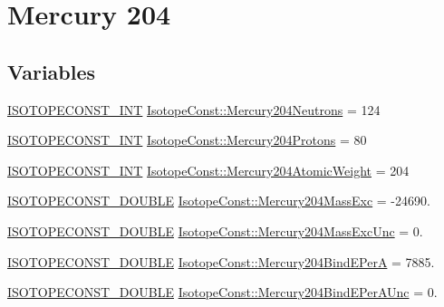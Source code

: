 \hypertarget{group___isotope_const-_mercury-_hg204}{}\section{Mercury 204}
\label{group___isotope_const-_mercury-_hg204}
\subsection*{Variables}
\begin{DoxyCompactItemize}
\item 
\mbox{\hyperlink{group___isotope_const-_macros_ga5f18360b3e99483a35c32d789e62621c}{I\+S\+O\+T\+O\+P\+E\+C\+O\+N\+S\+T\+\_\+\+I\+NT}} \mbox{\hyperlink{group___isotope_const-_mercury-_hg204_ga34d12cb196ab67c979186ad89ba26d76}{Isotope\+Const\+::\+Mercury204\+Neutrons}} = 124
\item 
\mbox{\hyperlink{group___isotope_const-_macros_ga5f18360b3e99483a35c32d789e62621c}{I\+S\+O\+T\+O\+P\+E\+C\+O\+N\+S\+T\+\_\+\+I\+NT}} \mbox{\hyperlink{group___isotope_const-_mercury-_hg204_ga8f2e87f9b21193d877ad13abc948b1d9}{Isotope\+Const\+::\+Mercury204\+Protons}} = 80
\item 
\mbox{\hyperlink{group___isotope_const-_macros_ga5f18360b3e99483a35c32d789e62621c}{I\+S\+O\+T\+O\+P\+E\+C\+O\+N\+S\+T\+\_\+\+I\+NT}} \mbox{\hyperlink{group___isotope_const-_mercury-_hg204_ga12c71f3db8a6a1a6bec8277fc08cbe9c}{Isotope\+Const\+::\+Mercury204\+Atomic\+Weight}} = 204
\item 
\mbox{\hyperlink{group___isotope_const-_macros_ga8f45a7272ce02c0b4c65c44636ed719a}{I\+S\+O\+T\+O\+P\+E\+C\+O\+N\+S\+T\+\_\+\+D\+O\+U\+B\+LE}} \mbox{\hyperlink{group___isotope_const-_mercury-_hg204_ga4de6b578b3f449bab760bcad294b31fe}{Isotope\+Const\+::\+Mercury204\+Mass\+Exc}} = -\/24690.
\item 
\mbox{\hyperlink{group___isotope_const-_macros_ga8f45a7272ce02c0b4c65c44636ed719a}{I\+S\+O\+T\+O\+P\+E\+C\+O\+N\+S\+T\+\_\+\+D\+O\+U\+B\+LE}} \mbox{\hyperlink{group___isotope_const-_mercury-_hg204_ga0e52731996a4cb1b989f3f5358e4719c}{Isotope\+Const\+::\+Mercury204\+Mass\+Exc\+Unc}} = 0.
\item 
\mbox{\hyperlink{group___isotope_const-_macros_ga8f45a7272ce02c0b4c65c44636ed719a}{I\+S\+O\+T\+O\+P\+E\+C\+O\+N\+S\+T\+\_\+\+D\+O\+U\+B\+LE}} \mbox{\hyperlink{group___isotope_const-_mercury-_hg204_gaa4fa27bce19caf56cdc23d9ac38f5149}{Isotope\+Const\+::\+Mercury204\+Bind\+E\+PerA}} = 7885.
\item 
\mbox{\hyperlink{group___isotope_const-_macros_ga8f45a7272ce02c0b4c65c44636ed719a}{I\+S\+O\+T\+O\+P\+E\+C\+O\+N\+S\+T\+\_\+\+D\+O\+U\+B\+LE}} \mbox{\hyperlink{group___isotope_const-_mercury-_hg204_ga736856f7ae57c93554872258844633b4}{Isotope\+Const\+::\+Mercury204\+Bind\+E\+Per\+A\+Unc}} = 0.

\end{DoxyCompactItemize}

